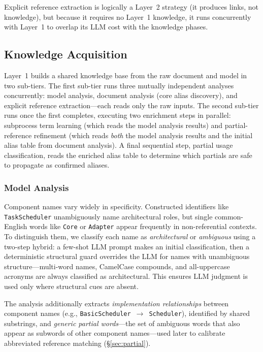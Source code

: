 \noindent Explicit reference extraction is logically a Layer~2
strategy (it produces links, not knowledge), but because it requires
no Layer~1 knowledge, it runs concurrently with Layer~1 to overlap
its LLM cost with the knowledge phases.



\subsection{Knowledge Acquisition}\label{sec:knowledge}

Layer~1 builds a shared knowledge base from the raw document and model
in two sub-tiers.
The first sub-tier runs three mutually independent analyses concurrently:
model analysis, document analysis (core alias discovery), and explicit
reference extraction---each reads only the raw inputs.
The second sub-tier runs once the first completes, executing two
enrichment steps in parallel:
subprocess term learning (which reads the model analysis results) and
partial-reference refinement (which reads \emph{both} the model
analysis results and the initial alias table from document analysis).
A final sequential step, partial usage classification, reads the
enriched alias table to determine which partials are safe to propagate
as confirmed aliases.

\subsubsection{Model Analysis}\label{sec:model-analysis}

Component names vary widely in specificity.
Constructed identifiers like \texttt{TaskScheduler} unambiguously name
architectural roles, but single common-English words like \texttt{Core}
or \texttt{Adapter} appear frequently in non-referential contexts.
To distinguish them, we classify each name as \emph{architectural}
or \emph{ambiguous} using a two-step hybrid:
a few-shot LLM prompt makes an initial classification, then a
deterministic structural guard overrides the LLM for names with
unambiguous structure---multi-word names, CamelCase compounds, and
all-uppercase acronyms are always classified as architectural.
This ensures LLM judgment is used only where structural cues are absent.

The analysis additionally extracts \emph{implementation relationships}
between component names
(e.g., \texttt{BasicScheduler}~$\to$~\texttt{Scheduler}),
identified by shared substrings, and \emph{generic partial words}---the
set of ambiguous words that also appear as subwords of other component
names---used later to calibrate abbreviated reference matching
(\S\ref{sec:partial}).

